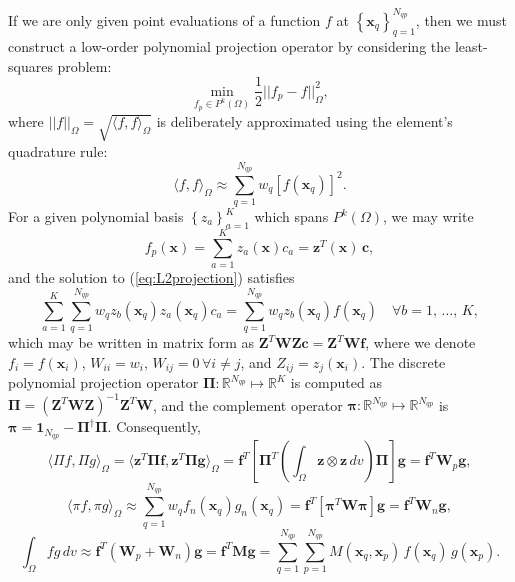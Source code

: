 	If we are only given point evaluations of a function $f$ at $\left\{ \mathbf{x}_q \right\}_{q=1}^{N_{qp}}$, then we must construct a low-order polynomial projection operator by considering the least-squares problem:
	\begin{equation}
		\min_{f_p \in P^k (\Omega)} \frac{1}{2} || f_p - f ||^2_\Omega,
	\end{equation}
	where $|| f ||_\Omega = \sqrt{\langle f, f \rangle_\Omega}$ is deliberately approximated using the element's quadrature rule:
	\begin{equation}
		\langle f, f \rangle_\Omega \approx \sum_{q=1}^{N_{qp}} w_q \left[ f(\mathbf{x}_q) \right]^2.
		\label{eq:L2projection}
	\end{equation}
	For a given polynomial basis $\left\{ z_a \right\}_{a=1}^{K}$ which spans $P^k (\Omega)$, we may write
	\begin{equation}
		f_p (\mathbf{x}) = \sum_{a=1}^{K} z_a (\mathbf{x}) c_a = \mathbf{z}^T (\mathbf{x}) \, \mathbf{c},
	\end{equation}
	and the solution to (\ref{eq:L2projection}) satisfies
	\begin{equation}
		\sum_{a=1}^{K} \sum_{q=1}^{N_{qp}} w_q z_b (\mathbf{x}_q) z_a (\mathbf{x}_q) c_a =
		\sum_{q=1}^{N_{qp}} w_q z_b (\mathbf{x}_q) f(\mathbf{x}_q) \quad \forall b = 1, \, \ldots, \, K,
	\end{equation}
	which may be written in matrix form as $\mathbf{Z}^T \mathbf{W} \mathbf{Z} \mathbf{c} = \mathbf{Z}^T \mathbf{W} \mathbf{f}$, where we denote $f_i = f(\mathbf{x}_i)$, $W_{ii} = w_i, \, W_{ij} = 0 \, \forall i \neq j$, and $Z_{ij} = z_j (\mathbf{x}_i)$. The discrete polynomial projection operator $\mathbf{\Pi} : \mathbb{R}^{N_{qp}} \mapsto \mathbb{R}^K$ is computed as $\boldsymbol{\Pi} = (\mathbf{Z}^T \mathbf{W} \mathbf{Z})^{-1} \mathbf{Z}^T \mathbf{W}$, and the complement operator $\boldsymbol{\pi} : \mathbb{R}^{N_{qp}} \mapsto \mathbb{R}^{N_{qp}}$ is $\boldsymbol{\pi} = \mathbf{1}_{N_{qp}} - \boldsymbol{\Pi}^\dagger \boldsymbol{\Pi}$. Consequently,
	\begin{equation}
		\langle \Pi f, \Pi g \rangle_{\Omega} = \langle \mathbf{z}^T \boldsymbol{\Pi} \mathbf{f}, \mathbf{z}^T \boldsymbol{\Pi} \mathbf{g} \rangle_{\Omega} = \mathbf{f}^T \left[ \boldsymbol{\Pi}^T \left( \int_{\Omega} \mathbf{z} \otimes \mathbf{z} \, dv \right) \boldsymbol{\Pi} \right] \mathbf{g} = \mathbf{f}^T \mathbf{W}_p \mathbf{g},
	\end{equation}
	\begin{equation}
		\langle \pi f, \pi g \rangle_{\Omega} \approx \sum_{q=1}^{N_{qp}} w_q f_n(\mathbf{x}_q) g_n(\mathbf{x}_q) = \mathbf{f}^T \left[ \boldsymbol{\pi}^T \mathbf{W} \boldsymbol{\pi} \right] \mathbf{g} = \mathbf{f}^T \mathbf{W}_n \mathbf{g},
	\end{equation}
	\begin{equation}
		\int_\Omega f g \, dv \approx \mathbf{f}^T (\mathbf{W}_p + \mathbf{W}_n) \mathbf{g} = \mathbf{f}^T \mathbf{M} \mathbf{g} = \sum_{q = 1}^{N_{qp}} \sum_{p = 1}^{N_{qp}} M (\mathbf{x}_q,\mathbf{x}_p) \, f (\mathbf{x}_q) \, g (\mathbf{x}_p).
	\end{equation}
	
